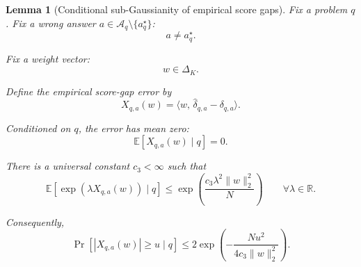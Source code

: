 \documentclass{article} %
\newtheorem{lemma}[theorem]{Lemma}
\providecommand{\Aq}{\mathcal{A}_q}
\providecommand{\simplex}{\Delta_K}
\providecommand{\ip}[2]{\langle #1,\, #2\rangle}
\providecommand{\dhat}{\widehat{\delta}}
\begin{document}
\begin{lemma}[Conditional sub-Gaussianity of empirical score gaps]
\label{lem:3}
Fix a problem \(q\).  Fix a wrong answer \(a\in\Aq\setminus\{a_q^\star\}\):
\begin{equation}
\label{eq:lem3-a}
a\ne a_q^\star .
\end{equation}

Fix a weight vector:
\begin{equation}
\label{eq:lem3-w}
w\in\simplex .
\end{equation}

Define the empirical score-gap error by
\begin{equation}
\label{eq:lem3-X}
X_{q,a}(w)
=
\ip{w}{\dhat_{q,a}-\delta_{q,a}} .
\end{equation}

Conditioned on \(q\), the error has mean zero:
\begin{equation}
\label{eq:lem3-mean}
\mathbb E\!\left[X_{q,a}(w)\mid q\right]
=
0 .
\end{equation}

There is a universal constant \(c_3<\infty\) such that
\begin{equation}
\label{eq:lem3-mgf}
\mathbb E\!\left[
\exp\!\left(\lambda X_{q,a}(w)\right)
\mid q
\right]
\le
\exp\!\left(
\frac{c_3\lambda^2\|w\|_2^2}{N}
\right)
\qquad
\forall \lambda\in\mathbb R .
\end{equation}

Consequently,
\begin{equation}
\label{eq:lem3-tail}
\Pr\!\left[
|X_{q,a}(w)|\ge u
\mid q
\right]
\le
2\exp\!\left(
-\frac{N u^2}{4c_3\|w\|_2^2}
\right).
\end{equation}
\end{lemma}
\end{document}
